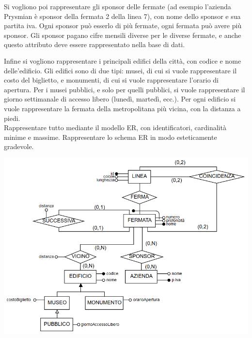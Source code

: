\documentclass[a4paper]{article}
\begin{document}
Si vogliono poi rappresentare gli sponsor delle fermate (ad esempio l'azienda Prysmian è sponsor della fermata 2 della linea 7), con nome dello sponsor e sua partita iva. Ogni sponsor può esserlo di più fermate, ogni fermata può avere più sponsor. Gli sponsor pagano cifre mensili diverse per le diverse fermate, e anche questo attributo deve essere rappresentato nella base di dati.

Infine si vogliono rappresentare i principali edifici della città, con codice e nome delle'edificio. Gli edifici sono di due tipi: musei, di cui si vuole rappresentare il costo del biglietto, e monumenti, di cui si vuole rappresentare l'orario di apertura. Per i musei pubblici, e solo per quelli pubblici, si vuole rappresentare il giorno settimanale di accesso libero (lunedì, martedì, ecc.). Per ogni edificio si vuole rappresentare la fermata della metropolitana più vicina, con la distanza a piedi.\medskip\medskip\\
%
Rappresentare tutto mediante il modello ER, con identificatori, cardinalità minime e massime. Rappresentare lo schema ER in modo esteticamente gradevole.
\begin{center}
  \includegraphics[scale=0.7]{img/es_er.png}
\end{center}
\end{document}
